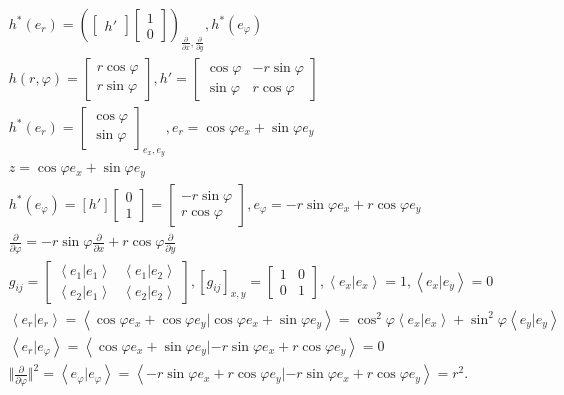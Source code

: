 \documentclass[../main.tex]{subfiles}
\begin{document}
\begin{align*}
    &h^*(e_r) = \left( \begin{bmatrix} h' \end{bmatrix} \begin{bmatrix} 1\\0 \end{bmatrix}  \right) _{\frac{\partial }{\partial x} , \frac{\partial }{\partial y} }, h^*(e_\varphi)\\
    &h(r,\varphi) = \begin{bmatrix} r \cos\varphi\\ r \sin \varphi \end{bmatrix} , h' = \begin{bmatrix} \cos\varphi& - r\sin\varphi \\ \sin \varphi & r \cos \varphi \end{bmatrix}\\
    & h^*(e_r) = \begin{bmatrix} \cos\varphi \\ \sin \varphi \end{bmatrix} _{e_x,e_y}, e_r = \cos \varphi e_x + \sin \varphi e_y \\
    &z = \cos \varphi e_x + \sin \varphi e_y \\
    &h^*(e_\varphi) = \left[ h' \right] \begin{bmatrix} 0\\1 \end{bmatrix} = \begin{bmatrix} -r\sin\varphi\\ r\cos\varphi \end{bmatrix}, e_\varphi = -r\sin\varphi e_x + r \cos \varphi e_y   \\
    &\frac{\partial }{\partial \varphi} = -r\sin\varphi \frac{\partial }{\partial x} + r\cos\varphi \frac{\partial }{\partial y}  \\
    &g_{ij} = \begin{bmatrix} \left<e_1|e_1 \right>& \left<e_1|e_2 \right>\\ \left<e_2|e_1 \right> & \left<e_2|e_2 \right> \end{bmatrix}, \left[ g_{ij} \right]_{x,y} = \begin{bmatrix} 1&0\\0&1 \end{bmatrix}, \left<e_x|e_x \right> =1, \left< e_x|e_y\right> =0\\
    &\left<e_r|e_r \right> = \left<\cos\varphi e_x + \cos\varphi e_y | \cos\varphi e_x + \sin \varphi e_y \right> = \cos^2\varphi \left<e_x|e_x \right> + \sin^2\varphi\left<e_y|e_y \right>\\
    &\left<e_r|e_\varphi \right> = \left<\cos\varphi e_x + \sin \varphi e_y| -r\sin\varphi e_x + r\cos\varphi e_y \right> =0\\
    &\Vert \frac{\partial }{\partial \varphi}  \Vert ^2 = \left<e_\varphi|e_\varphi \right> = \left<-r\sin\varphi e_x + r\cos\varphi e_y| -r\sin\varphi e_x + r\cos\varphi e_y \right> = r^2
.\end{align*}
\end{document}
